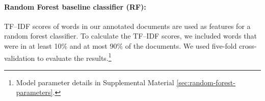 \documentclass[11pt,a4paper]{article}
\begin{document}



\paragraph{Random Forest baseline classifier (RF):} TF--IDF scores of words in our annotated documents are used as features for a random forest classifier. To calculate the TF--IDF scores, we included words that were in at least 10\% and at most 90\% of the documents. We used five-fold cross-validation to evaluate the results.\footnote{Model parameter details in Supplemental Material \ref{sec:random-forest-parameters}.}
\end{document}
